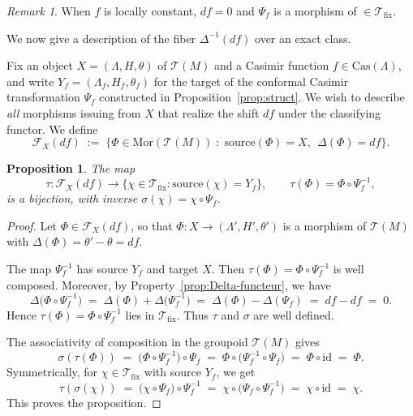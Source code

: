 \documentclass[11pt,a4paper]{article}
\theoremstyle{plain}
\newtheorem{proposition}[theorem]{Proposition}
\theoremstyle{definition}
\theoremstyle{remark}
\newtheorem{remark}[theorem]{Remark}
\begin{document}
\begin{remark}
	When $f$ is locally constant, $df = 0$ and $\Psi_f$  is  a morphism of $\in \mathcal{T}_{\mathrm{fix}}$.
\end{remark}

We now give a description of the fiber $\Delta^{-1}(df)$ over an exact class.

Fix an object $X = (\Lambda, H, \theta)$ of $\mathcal{T}(M)$ and a Casimir function $f \in \mathrm{Cas}(\Lambda)$, and write $Y_f = (\Lambda_f, H_f, \theta_f)$ for the target of the conformal Casimir transformation $\Psi_f$ constructed in Proposition~\ref{prop:struct}. We wish to describe \emph{all} morphisms issuing from $X$ that realize the shift $df$ under the classifying functor. We define
$$
\mathcal{F}_X(df) \;:=\; \bigl\{ \Phi \in \mathrm{Mor}(\mathcal{T}(M)) \;:\; \mathrm{source}(\Phi) = X,\ \ \Delta(\Phi) = df \bigr\}.
$$

\begin{proposition}\label{prop:reduction}
	The map
	$$
	\tau \colon \mathcal{F}_X(df) \longrightarrow \bigl\{ \chi \in \mathcal{T}_{\mathrm{fix}} : \mathrm{source}(\chi) = Y_f \bigr\},
	\qquad \tau(\Phi) = \Phi \circ \Psi_f^{-1},
	$$
	is a bijection, with inverse $\sigma(\chi) = \chi \circ \Psi_f$.
\end{proposition}

\begin{proof}
	Let $\Phi \in \mathcal{F}_X(df)$, so that $\Phi \colon X \to (\Lambda', H', \theta')$ is a morphism of $\mathcal{T}(M)$ with $\Delta(\Phi) = \theta' - \theta = df$.
	
	The map $\Psi_f^{-1}$ has source $Y_f$ and target $X$. Then $\tau(\Phi) = \Phi \circ \Psi_f^{-1}$ is well composed. Moreover, by Property~\ref{prop:Delta-functeur}, we have
	$$
	\Delta\bigl(\Phi \circ \Psi_f^{-1}\bigr) \;=\; \Delta(\Phi) + \Delta\bigl(\Psi_f^{-1}\bigr)
	\;=\; \Delta(\Phi) - \Delta(\Psi_f) \;=\; df - df \;=\; 0.
	$$
	Hence $\tau(\Phi) = \Phi \circ \Psi_f^{-1}$ lies in $\mathcal{T}_{\mathrm{fix}}$. Thus $\tau$ and $\sigma$ are well defined.
	
	The associativity of composition in the groupoid $\mathcal{T}(M)$ gives
	$$
	\sigma(\tau(\Phi)) \;=\; \bigl(\Phi \circ \Psi_f^{-1}\bigr) \circ \Psi_f
	\;=\; \Phi \circ \bigl(\Psi_f^{-1} \circ \Psi_f\bigr) \;=\; \Phi \circ \mathrm{id} \;=\; \Phi.
	$$
	Symmetrically, for $\chi \in \mathcal{T}_{\mathrm{fix}}$ with source $Y_f$, we get
	$$
	\tau(\sigma(\chi)) \;=\; \bigl(\chi \circ \Psi_f\bigr) \circ \Psi_f^{-1}
	\;=\; \chi \circ \bigl(\Psi_f \circ \Psi_f^{-1}\bigr) \;=\; \chi \circ \mathrm{id} \;=\; \chi.
	$$
	This proves the proposition.
\end{proof}
\end{document}
